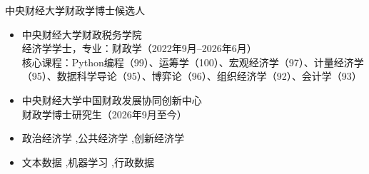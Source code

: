\documentclass[a4paper,10pt]{article}
\begin{document}

\begin{center}
  \small 中央财经大学财政学博士候选人
\end{center}
\vspace{-0.5em}



\begin{itemize}
\item 中央财经大学财政税务学院\\
  经济学学士，专业：财政学（2022年9月--2026年6月）\\
  核心课程：Python编程（99）、运筹学（100）、宏观经济学（97）、计量经济学（95）、数据科学导论（95）、博弈论（96）、组织经济学（92）、会计学（93）

\item 中央财经大学中国财政发展协同创新中心\\
  财政学博士研究生（2026年9月至今）

\end{itemize}


\begin{itemize}
\item {}政治经济学 \sep 公共经济学 \sep 创新经济学
\item {}文本数据 \sep 机器学习 \sep 行政数据
\end{itemize}

\end{document}
